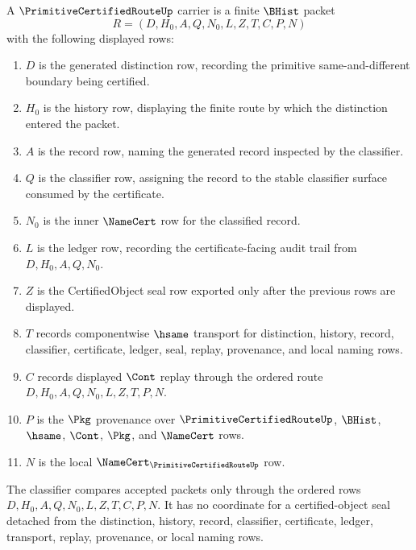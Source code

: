 \begin{definition}
\label{def:primitive-certified-route-carrier}
A $\PrimitiveCertifiedRouteUp$ carrier is a finite $\BHist$ packet
$$
R=(D,H_0,A,Q,N_0,L,Z,T,C,P,N)
$$
with the following displayed rows:
\begin{enumerate}
\item $D$ is the generated distinction row, recording the primitive same-and-different boundary being certified.
\item $H_0$ is the history row, displaying the finite route by which the distinction entered the packet.
\item $A$ is the record row, naming the generated record inspected by the classifier.
\item $Q$ is the classifier row, assigning the record to the stable classifier surface consumed by the certificate.
\item $N_0$ is the inner $\NameCert$ row for the classified record.
\item $L$ is the ledger row, recording the certificate-facing audit trail from $D,H_0,A,Q,N_0$.
\item $Z$ is the CertifiedObject seal row exported only after the previous rows are displayed.
\item $T$ records componentwise $\hsame$ transport for distinction, history, record, classifier, certificate, ledger, seal, replay, provenance, and local naming rows.
\item $C$ records displayed $\Cont$ replay through the ordered route $D,H_0,A,Q,N_0,L,Z,T,P,N$.
\item $P$ is the $\Pkg$ provenance over $\PrimitiveCertifiedRouteUp$, $\BHist$, $\hsame$, $\Cont$, $\Pkg$, and $\NameCert$ rows.
\item $N$ is the local $\NameCert_{\PrimitiveCertifiedRouteUp}$ row.
\end{enumerate}
The classifier compares accepted packets only through the ordered rows $D,H_0,A,Q,N_0,L,Z,T,C,P,N$. It has no coordinate for a certified-object seal detached from the distinction, history, record, classifier, certificate, ledger, transport, replay, provenance, or local naming rows.
\end{definition}

